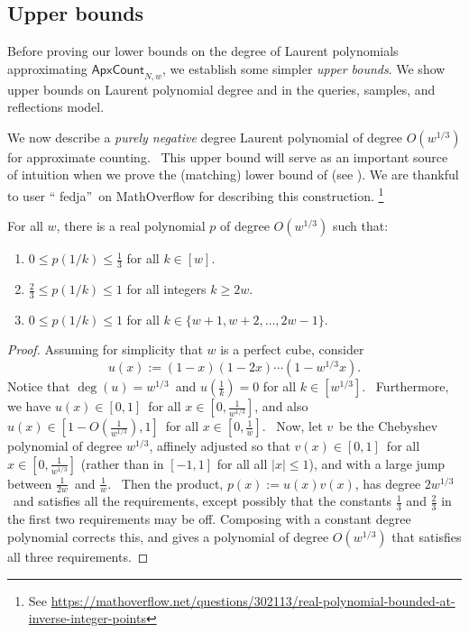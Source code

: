 %
\subsection{Upper bounds}
\label{UPPER}\label{sec:upper}

Before proving our lower bounds on the degree of 
Laurent polynomials approximating $\mathsf{ApxCount}_{N,w}$, we
establish some simpler \emph{upper bounds}.
We show upper bounds on Laurent polynomial degree and in the 
queries, samples, and reflections model.

We now describe a \emph{purely negative} degree Laurent polynomial of degree $O(w^{1/3})$ for
approximate counting. \ This upper bound will serve as an important source
of intuition when we prove the (matching) lower bound of 
(see ). We are thankful to user \textquotedblleft
fedja\textquotedblright\ on MathOverflow for describing this construction.
\footnote{
See 
\url{https://mathoverflow.net/questions/302113/real-polynomial-bounded-at-inverse-integer-points}
}

\begin{lemma}[fedja]
\label{fedjatight} For all $w$, there is a real polynomial $p$ of degree $O\left(w^{1/3}\right)$ such that:
\begin{enumerate}
\item $0 \le p(1/k) \le \frac{1}{3}$ for all $k \in [w]$.
\item $\frac{2}{3} \le p(1/k) \le 1$ for all integers $k \ge 2w$.
\item $0 \le p(1/k) \le 1$ for all $k \in \{w+1,w+2,\ldots,2w-1\}$.
\end{enumerate}
\end{lemma}

\begin{proof}
Assuming for simplicity that $w$ is a perfect cube, consider
\begin{equation}
u\left(  x\right)  :=\left(  1-x\right)  \left(  1-2x\right)  \cdots\left(
1-w^{1/3}x\right)  .
\end{equation}
Notice that $\deg\left(  u\right)  =w^{1/3}$\ and $u\left(  \frac{1}
{k}\right)  =0$ for all $k\in\left[  w^{1/3}\right]  $. \ Furthermore, we have
$u\left(  x\right) \in [0,1]$\ for all $x\in\left[
0,\frac{1}{w^{1/3}}\right]  $, and also $u\left(  x\right)  \in\left[
1-O\left(  \frac{1}{w^{1/3}}\right)  ,1\right]  $\ for all $x\in\left[
0,\frac{1}{w}\right]  $. \ Now, let $v$\ be the Chebyshev polynomial of degree
$w^{1/3}$, affinely adjusted so that $v\left(  x\right)
\in [0,1]$\ for all $x\in\left[  0,\frac{1}{w^{1/3}}\right]  $ (rather
than in $[-1,1]$ for all all $\left\vert x\right\vert \leq1$), and with a large jump between
$\frac{1}{2w}$\ and $\frac{1}{w}$. \ Then the product, $p(x):=u\left(  x\right)  v\left(  x\right)  $, has degree $2w^{1/3}$\ and
satisfies all the requirements, except possibly that the constants $\frac{1}{3}$ and $\frac{2}{3}$ in the first two requirements may be off. Composing with a constant degree polynomial corrects this, and gives a polynomial of degree $O(w^{1/3})$ that satisfies all three requirements.
\end{proof}

